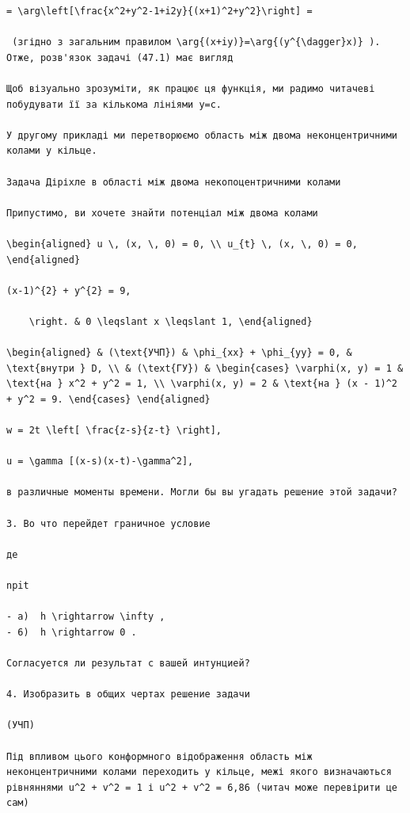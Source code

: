\documentclass[
  ukrainian,
]{article}
\begin{document}
\begin{verbatim}
= \arg\left[\frac{x^2+y^2-1+i2y}{(x+1)^2+y^2}\right] =

 (згідно з загальним правилом \arg{(x+iy)}=\arg{(y^{\dagger}x)} ). Отже, розв'язок задачі (47.1) має вигляд

Щоб візуально зрозуміти, як працює ця функція, ми радимо читачеві побудувати її за кількома лініями y=c.

У другому прикладі ми перетворюємо область між двома неконцентричними колами у кільце.

Задача Діріхле в області між двома некопоцентричними колами

Припустимо, ви хочете знайти потенціал між двома колами

\begin{aligned} u \, (x, \, 0) = 0, \\ u_{t} \, (x, \, 0) = 0, \end{aligned}

(x-1)^{2} + y^{2} = 9,

    \right. & 0 \leqslant x \leqslant 1, \end{aligned}

\begin{aligned} & (\text{УЧП}) & \phi_{xx} + \phi_{yy} = 0, & \text{внутри } D, \\ & (\text{ГУ}) & \begin{cases} \varphi(x, y) = 1 & \text{на } x^2 + y^2 = 1, \\ \varphi(x, y) = 2 & \text{на } (x - 1)^2 + y^2 = 9. \end{cases} \end{aligned}

w = 2t \left[ \frac{z-s}{z-t} \right],

u = \gamma [(x-s)(x-t)-\gamma^2],

в различные моменты времени. Могли бы вы угадать решение этой задачи?

3. Во что перейдет граничное условие

де

npit

- a)  h \rightarrow \infty ,
- 6)  h \rightarrow 0 .

Согласуется ли результат с вашей интунцией?

4. Изобразить в общих чертах решение задачи

(УЧП)

Під впливом цього конформного відображення область між неконцентричними колами переходить у кільце, межі якого визначаються рівняннями u^2 + v^2 = 1 і u^2 + v^2 = 6,86 (читач може перевірити це сам)


\end{verbatim}
\end{document}
